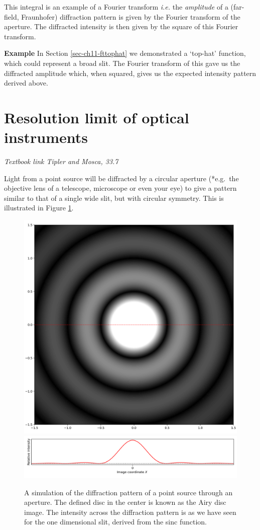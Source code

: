 \documentclass[
]{book}
\begin{document}
This integral is an example of a Fourier transform \emph{i.e.} the \emph{amplitude} of a (far-field, Fraunhofer) diffraction pattern is given by the Fourier transform of the aperture. The diffracted intensity is then given by the square of this Fourier transform.

\textbf{Example} In Section \ref{sec-ch11-fttophat} we demonstrated a `top-hat' function, which could represent a broad slit. The Fourier transform of this gave us the diffracted amplitude which, when squared, gives us the expected intensity pattern derived above.

\hypertarget{sec-ch13-resolutionlimit}{%
\section{Resolution limit of optical instruments}\label{sec-ch13-resolutionlimit}}

\emph{Textbook link Tipler and Mosca, 33.7}

Light from a point source will be diffracted by a circular aperture (*e.g.~the objective lens of a telescope, microscope or even your eye) to give a pattern similar to that of a single wide slit, but with circular symmetry. This is illustrated in Figure \ref{fig:ch13-circulardiffraction1}.

\begin{figure}

{\centering \includegraphics[width=0.7\linewidth]{visualisations/ch13-singlesource-diffraction} \includegraphics[width=0.7\linewidth]{visualisations/ch13-singlesource-diffraction-b} 

}

\caption{A simulation of the diffraction pattern of a point source through an aperture. The defined disc in the center is known as the Airy disc image. The intensity across the diffraction pattern is as we have seen for the one dimensional slit, derived from the sinc function.}\label{fig:ch13-circulardiffraction1}
\end{figure}
\end{document}
